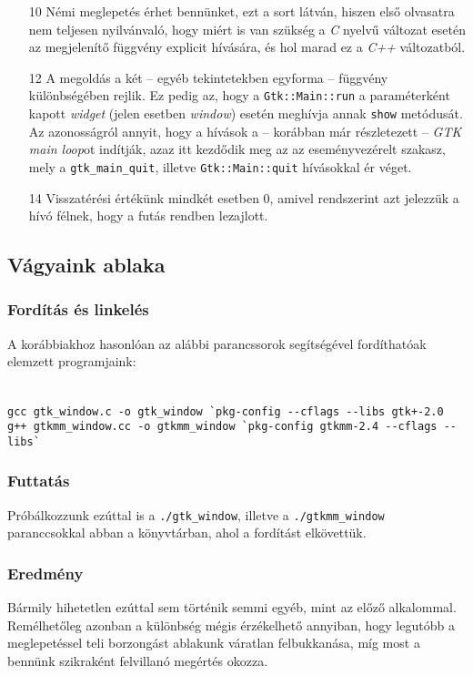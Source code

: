 \documentclass[a4paper,10pt]{article}
\begin{document}
\begin{enumerate}
 \item[10] Némi meglepetés érhet bennünket, ezt a sort látván, hiszen első olvasatra nem teljesen nyilvánvaló, hogy miért is van szükség a \textit{C} nyelvű változat esetén az megjelenítő függvény explicit hívására, és hol marad ez a \textit{C++} változatból.

 \item[12] A megoldás a két -- egyéb tekintetekben egyforma -- függvény különbségében rejlik. Ez pedig az, hogy a \texttt{Gtk::Main::run} a paraméterként kapott \textit{widget} (jelen esetben \textit{window}) esetén meghívja annak \texttt{show} metódusát. Az azonosságról annyit, hogy a hívások a -- korábban már részletezett -- \textit{GTK main loop}ot indítják, azaz itt kezdődik meg az az eseményvezérelt szakasz, mely a \texttt{gtk\_main\_quit}, illetve \texttt{Gtk::Main::quit} hívásokkal ér véget.

 \item[14] Visszatérési értékünk mindkét esetben 0, amivel rendszerint azt jelezzük a hívó félnek, hogy a futás rendben lezajlott.
\end{enumerate}

\subsection{Vágyaink ablaka}

\subsubsection{Fordítás és linkelés}

A korábbiakhoz hasonlóan az alábbi parancssorok segítségével fordíthatóak e\-lem\-zett programjaink:

\fontsize{8pt}{8pt}
\ \\
\texttt{gcc gtk\_window.c -o gtk\_window \`{}pkg-config {-}-cflags {-}-libs gtk+-2.0}
\ \\
\texttt{g++ gtkmm\_window.cc -o gtkmm\_window \`{}pkg-config gtkmm-2.4 {-}-cflags {-}-libs\`{}}

\subsubsection{Futtatás}

Próbálkozzunk ezúttal is a \texttt{./gtk\_window}, illetve a \texttt{./gtkmm\_window} paranccsokkal abban a könyvtárban, ahol a fordítást elkövettük.

\subsubsection{Eredmény}

Bármily hihetetlen ezúttal sem történik semmi egyéb, mint az előző alkalommal. Remélhetőleg azonban a különbség mégis érzékelhető annyiban, hogy legutóbb a meglepetéssel teli borzongást ablakunk váratlan felbukkanása, míg most a bennünk szikraként felvillanó megértés okozza.

\nocite{gtktut}
\nocite{gtkmmtut}
\nocite{ggad}
\nocite{gtktutmagy}



\end{document}
